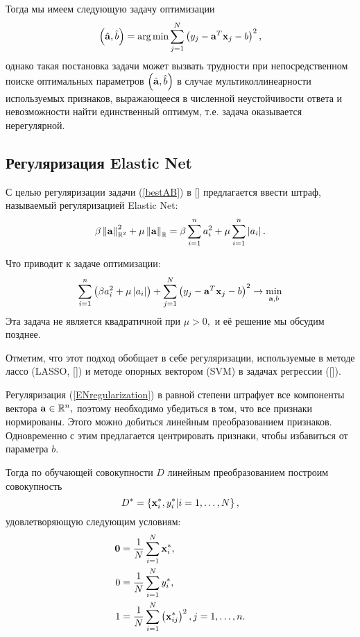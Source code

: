 Тогда мы имеем следующую задачу оптимизации 
\begin{equation}
	\label{bestAB}
	\left(\hat{\boldsymbol{\mathbf{a}}}, \hat b\right) = \mathop{\mbox{arg\ \!min}}\limits \sum\limits_{j=1}^N\left(y_j - \boldsymbol{\mathbf{a}}^T \boldsymbol{\mathbf{x}}_j - b\right)^2, 
\end{equation}
однако такая постановка задачи может вызвать трудности при непосредственном поиске оптимальных параметров $\left(\hat{\boldsymbol{\mathbf{a}}}, \hat b\right)$ в случае мультиколлинеарности используемых признаков, 
выражающееся в численной неустойчивости ответа и невозможности найти единственный оптимум, т.е. задача оказывается нерегулярной.

\subsection{Регуляризация Elastic Net}
С целью регуляризации задачи (\ref{bestAB}) в [] предлагается ввести штраф, называемый регуляризацией Elastic Net:
\begin{equation}
	\label{ENregularization}
	\beta \left\|{\boldsymbol{\mathbf{a}}}\right\|_{\mathbb R^2}^2 + \mu \left\|{\boldsymbol{\mathbf{a}}}\right\|_{\mathbb R} 
	= \beta \sum\limits_{i=1}^n a_i^2 + \mu \sum\limits_{i=1}^n \left|a_i\right|.
\end{equation}

Что приводит к задаче оптимизации: 
\begin{equation}
	\label{basicEN}
	\sum_{i=1}^n\left(\beta a_i^2 + \mu \left|a_i\right|\right) 
	+ \sum_{j=1}^N\left(y_j - \boldsymbol{\mathbf{a}}^T \boldsymbol{\mathbf{x}}_j - b\right)^2 
	\to \mathop{\mbox{min}}\limits_{\boldsymbol{\mathbf{a}}, b}
\end{equation}
Эта задача не является квадратичной при $\mu > 0,$ и её решение мы обсудим позднее.

Отметим, что этот подход обобщает в себе регуляризации, используемые в методе лассо (LASSO, []) и методе опорных вектором (SVM) в задачах регрессии ([]).

Регуляризация (\ref{ENregularization}) в равной степени штрафует все компоненты вектора $\boldsymbol{\mathbf{a}}\in \mathbb R^n,$ поэтому необходимо убедиться в том, что все признаки нормированы. 
Этого можно добиться линейным преобразованием признаков. 
Одновременно с этим предлагается центрировать признаки, чтобы избавиться от параметра $b$.

Тогда по обучающей совокупности $D$ линейным преобразованием построим совокупность
\begin{equation*}
	D^* = \left\{\boldsymbol{\mathbf{x}}^*_i, y^*_i | i = 1, \ldots, N\right\}, 
\end{equation*}
удовлетворяющую следующим условиям:
\begin{align}
	\label{normalization-start}
	\boldsymbol{\mathbf{0}} 	&= \frac1N\sum\limits_{i=1}^N\boldsymbol{\mathbf{x}}^*_i, \\
	0 		&= \frac1N\sum\limits_{i=1}^N y^*_i, \\
	\label{normalization-end}
	1 		&= \frac1N\sum\limits_{i=1}^N\left(\boldsymbol{\mathbf{x}}^*_{ij}\right)^2, j=1,\ldots, n.
\end{align}

